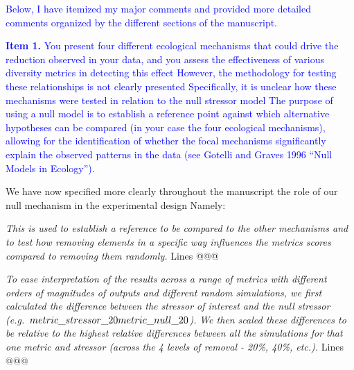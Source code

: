 \documentclass[
]{article}
\begin{document}
\textcolor{blue}{Below, I have itemized my major comments and provided more detailed comments organized by the different sections of the manuscript.}

\textcolor{blue}{\textbf{Item 1.}}
\textcolor{blue}{You present four different ecological mechanisms that could drive the reduction observed in your data, and you assess the effectiveness of various diversity metrics in detecting this effect
However, the methodology for testing these relationships is not clearly presented
Specifically, it is unclear how these mechanisms were tested in relation to the null stressor model
The purpose of using a null model is to establish a reference point against which alternative hypotheses can be compared (in your case the four ecological mechanisms), allowing for the identification of whether the focal mechanisms significantly explain the observed patterns in the data (see Gotelli and Graves 1996 ``Null Models in Ecology'').}

We have now specified more clearly throughout the manuscript the role of our null mechanism in the experimental design
Namely:

\textit{This is used to establish a reference to be compared to the other mechanisms and to test how removing elements in a specific way influences the metrics scores compared to removing them randomly.}
Lines @@@

\textit{To ease interpretation of the results across a range of metrics with different orders of magnitudes of outputs and different random simulations, we first calculated the difference between the stressor of interest and the null stressor (e.g.~\(metric\_stressor\_20 \- metric\_null\_20\)).}
\textit{We then scaled these differences to be relative to the highest relative differences between all the simulations for that one metric and stressor (across the 4 levels of removal - 20\%, 40\%, etc.).}
Lines @@@

\end{document}
